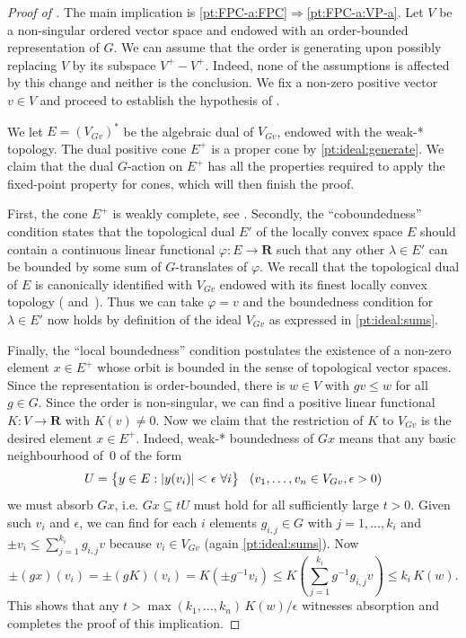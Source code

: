 \documentclass[11pt]{amsart}
\numberwithin{equation}{section}
\theoremstyle{definition}
\theoremstyle{definition}
\newcommand*{\RR}{\mathbf{R}}
\newcommand*{\se}{\subseteq}
\newcommand*{\inv}{^{-1}}
\begin{document}
\begin{proof}[Proof of ]
The main implication is \ref{pt:FPC-a:FPC}$\Longrightarrow$\ref{pt:FPC-a:VP-a}. Let $V$ be a non-singular ordered vector space and endowed with an order-bounded representation of $G$. We can assume that the order is generating upon possibly replacing $V$ by its subspace $V^+ - V^+$. Indeed, none of the assumptions is affected by this change and neither is the conclusion. We fix a non-zero positive vector $v \in V$ and proceed to establish the hypothesis of .

We let $E=(V_{G v})^*$ be the algebraic dual of $V_{G v}$, endowed with the weak-* topology. The dual positive cone $E^+$ is a proper cone by \ref{pt:ideal:generate}. We claim that the dual $G$-action on $E^+$ has all the properties required to apply the fixed-point property for cones, which will then finish the proof.

First, the cone $E^+$ is weakly complete, see . Secondly, the ``coboundedness'' condition states that the topological dual $E'$ of the locally convex space $E$ should contain a continuous linear functional $\varphi\colon E \to \RR$ such that any other $\lambda\in E'$ can be bounded by some sum of $G$-translates of $\varphi$. We recall that the topological dual of $E$ is canonically identified with $V_{G v}$ endowed with its finest locally convex topology (\cite[3.14]{RudinFA} and~\cite[II \S\,6 No.\,1)]{BourbakiEVT81}). Thus we can take $\varphi=v$ and the boundedness condition for $\lambda\in E'$ now holds by definition of the ideal $V_{G v}$ as expressed in \ref{pt:ideal:sums}.

Finally, the ``local boundedness'' condition postulates the existence of a non-zero element $x\in E^+$ whose orbit is bounded in the sense of topological vector spaces. Since the representation is order-bounded, there is $w\in V$ with $g v\leq w$ for all $g\in G$. Since the order is non-singular, we can find a positive linear functional $K\colon V\to\RR$ with $K(v)\neq 0$. Now we claim that the restriction of $K$ to $V_{G v}$ is the desired element $x\in E^+$. Indeed, weak-* boundedness of $G x$ means that any basic neighbourhood of~$0$ of the form
\begin{equation*}
U=\big\{ y\in E : |y(v_i)|<\epsilon \ \forall i \big\} \kern3mm (v_1, \ldots, v_n\in V_{G v}, \epsilon >0)
\end{equation*}
we must absorb $Gx$, i.e. $G x \se t U$ must hold for all sufficiently large $t>0$. Given such $v_i$ and $\epsilon$, we can find for each $i$ elements $g_{i,j}\in G$ with $j=1, \ldots, k_i$ and $\pm v_i \leq \sum_{j=1}^{k_i} g_{i,j}v$ because $v_i\in  V_{G v}$ (again \ref{pt:ideal:sums}). Now
\begin{equation*}
\pm (gx)(v_i) =\pm (g K) (v_i) = K(\pm g\inv v_i) \leq K\left(\sum_{j=1}^{k_i} g\inv g_{i,j}v\right) \leq k_i \, K(w).
\end{equation*}
This shows that any $t > \max(k_1, \ldots , k_n) \, K(w) / \epsilon$ witnesses absorption and completes the proof of this implication.


\end{proof}
\end{document}
